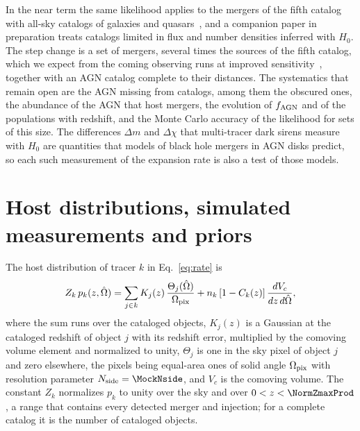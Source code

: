 \documentclass[aps,prd,reprint,amsmath,amssymb,nofootinbib]{revtex4-2}
\newcommand{\fAGN}{f_{\rm AGN}}
\begin{document}
In the near term the same likelihood applies to the mergers of the fifth catalog with all-sky catalogs of galaxies and quasars~\cite{Dalya:2021ewn,Storey-Fisher:2023gca}, and a companion paper in preparation treats catalogs limited in flux and number densities inferred with $H_0$.
The step change is a set of \MockNev{} mergers, several times the \IndLitFifthNsrc{} sources of the fifth catalog, which we expect from the coming observing runs at improved sensitivity~\cite{KAGRA:2013rdx}, together with an AGN catalog complete to their distances.
The systematics that remain open are the AGN missing from catalogs, among them the obscured ones, the abundance of the AGN that host mergers, the evolution of $\fAGN$ and of the populations with redshift, and the Monte Carlo accuracy of the likelihood for sets of this size.
The differences $\Delta m$ and $\Delta\chi$ that multi-tracer dark sirens measure with $H_0$ are quantities that models of black hole mergers in AGN disks predict, so each such measurement of the expansion rate is also a test of those models.

\appendix

\section{Host distributions, simulated measurements and priors}
\label{app:sim}

The host distribution of tracer $k$ in Eq.~\eqref{eq:rate} is
\begin{equation}
Z_k\,p_k(z,\hat\Omega)=\sum_{j\in k}K_j(z)\,\frac{\Theta_j(\hat\Omega)}{\Omega_{\rm pix}}+n_k\,[1-C_k(z)]\,\frac{dV_c}{dz\,d\hat\Omega},
\label{eq:hosts}
\end{equation}
where the sum runs over the cataloged objects, $K_j(z)$ is a Gaussian at the cataloged redshift of object $j$ with its redshift error, multiplied by the comoving volume element and normalized to unity, $\Theta_j$ is one in the sky pixel of object $j$ and zero elsewhere, the pixels being equal-area ones of solid angle $\Omega_{\rm pix}$ with resolution parameter $N_{\rm side}=\MockNside$, and $V_c$ is the comoving volume.
The constant $Z_k$ normalizes $p_k$ to unity over the sky and over $0<z<\NormZmaxProd$, a range that contains every detected merger and injection; for a complete catalog it is the number of cataloged objects.
\end{document}
